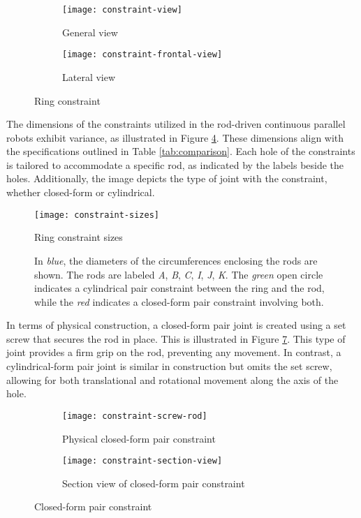 \begin{figure}[H]
    \centering
    \begin{subfigure}[t]{0.6\textwidth}
        \texttt{[image: constraint-view]}
        \caption{General view}
        \label{fig:cons-view}
    \end{subfigure}
    \begin{subfigure}[t]{0.6\textwidth}
        \texttt{[image: constraint-frontal-view]}
        \caption{Lateral view}
        \label{fig:cons-front-view}
    \end{subfigure}
    \caption{Ring constraint}
    \label{fig:ring-constraint}
\end{figure}

The dimensions of the constraints utilized in the rod-driven continuous parallel robots exhibit variance, as illustrated in Figure \ref{fig:cons-sizes}. These dimensions align with the specifications outlined in Table \ref{tab:comparison}. Each hole of the constraints is tailored to accommodate a specific rod, as indicated by the labels beside the holes. Additionally, the image depicts the type of joint with the constraint, whether closed-form or cylindrical.

\begin{figure}[H]
    \centering
    \texttt{[image: constraint-sizes]}
    \caption{Ring constraint sizes}
    \label{fig:cons-sizes}
    \caption*{In \textit{blue}, the diameters of the circumferences enclosing the rods are shown. The rods are labeled \textit{A}, \textit{B}, \textit{C}, \textit{I}, \textit{J}, \textit{K}. The \textit{green} open circle indicates a cylindrical pair constraint between the ring and the rod, while the \textit{red} indicates a closed-form pair constraint involving both.}
\end{figure}

In terms of physical construction, a closed-form pair joint is created using a set screw that secures the rod in place. This is illustrated in Figure \ref{fig:closed-constraint}. This type of joint provides a firm grip on the rod, preventing any movement. In contrast, a cylindrical-form pair joint is similar in construction but omits the set screw, allowing for both translational and rotational movement along the axis of the hole.

\begin{figure} [H]
    \centering
    \begin{subfigure}[t]{0.45\textwidth}
        \texttt{[image: constraint-screw-rod]}
        \caption{Physical closed-form pair constraint}
        \label{fig:cons_physical}
    \end{subfigure}
    \begin{subfigure}[t]{0.45\textwidth}
        \texttt{[image: constraint-section-view]}
        \caption{Section view of closed-form pair constraint}
        \label{fig:cons_physical_section}
    \end{subfigure}
    \caption{Closed-form pair constraint}
    \label{fig:closed-constraint}
\end{figure}
